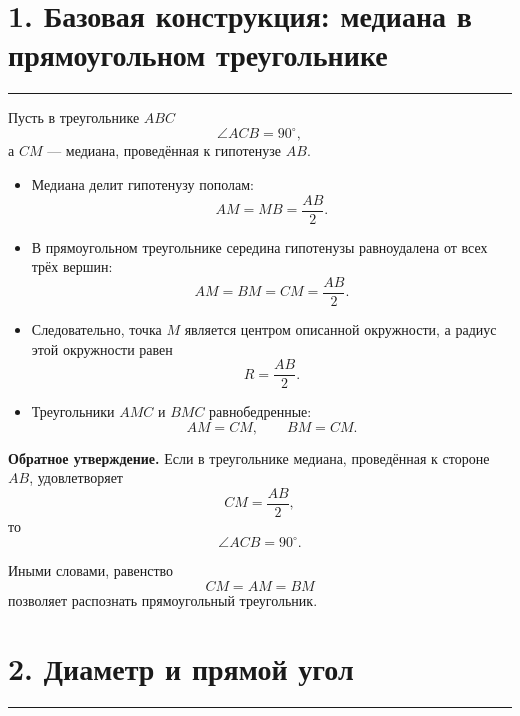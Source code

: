 \documentclass[a4paper,12pt]{article}
\newcommand{\checkitem}{\item[\textcolor{accent}{$\square$}]}
\newcommand{\key}[1]{\textcolor{darkaccent}{\textbf{#1}}}
\newcommand{\sectionrule}{%
  \par\vspace{-0.35em}%
  {\color{accent!60}\rule{\linewidth}{0.7pt}}%
  \vspace{0.35em}
}
\begin{document}
\section*{\textcolor{darkaccent}{1. Базовая конструкция: медиана в прямоугольном треугольнике}}
\sectionrule

Пусть в треугольнике \(ABC\)
\[
\angle ACB=90^\circ,
\]
а \(CM\) --- медиана, проведённая к гипотенузе \(AB\).

\begin{itemize}
  \checkitem Медиана делит гипотенузу пополам:
  \[
  AM=MB=\frac{AB}{2}.
  \]

  \checkitem В прямоугольном треугольнике середина гипотенузы равноудалена
  от всех трёх вершин:
  \[
  \boxed{AM=BM=CM=\frac{AB}{2}}.
  \]

  \checkitem Следовательно, точка \(M\) является центром описанной окружности,
  а радиус этой окружности равен
  \[
  R=\frac{AB}{2}.
  \]

  \checkitem Треугольники \(AMC\) и \(BMC\) равнобедренные:
  \[
  AM=CM,\qquad BM=CM.
  \]
\end{itemize}

\begin{center}
\end{center}

\key{Обратное утверждение.}
Если в треугольнике медиана, проведённая к стороне \(AB\), удовлетворяет
\[
CM=\frac{AB}{2},
\]
то
\[
\angle ACB=90^\circ.
\]

Иными словами, равенство
\[
CM=AM=BM
\]
позволяет распознать прямоугольный треугольник.

\section*{\textcolor{darkaccent}{2. Диаметр и прямой угол}}
\sectionrule
\end{document}
